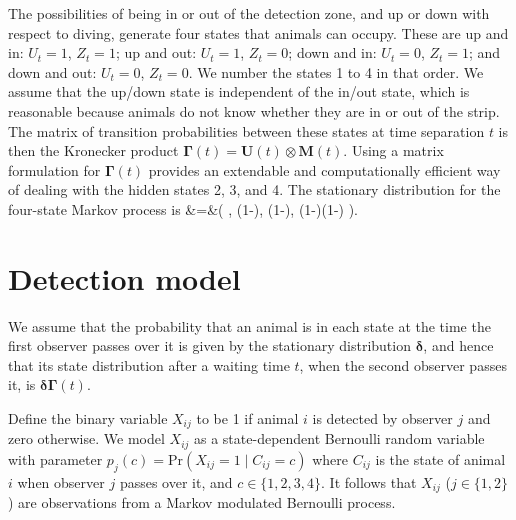 \documentclass[useAMS, usenatbib, referee]{biom}\usepackage[]{graphicx}\usepackage[]{color}
\begin{document}
The possibilities of being in or out of the detection zone, and up or down with respect to diving, generate four states that animals can occupy. These are up and in: $U_t=1$, $Z_t=1$; up and out: $U_t=1$, $Z_t=0$; down and in: $U_t=0$, $Z_t=1$; and down and out: $U_t=0$, $Z_t=0$. We number the states 1 to 4 in that order. We assume that the up/down state is independent of the in/out state, which is reasonable because animals do not know whether they are in or out of the strip. The matrix of transition probabilities between these states at time separation $t$ is then the Kronecker product $\bm{\Gamma}(t)=\bm{U}(t)\otimes\bm{M}(t)$. Using a matrix formulation for $\bm{\Gamma}(t)$ provides an extendable and computationally efficient way of dealing with the hidden states 2, 3, and 4. The stationary distribution for the four-state Markov process is
\be
\bm{\delta}&=&\Bigg(
\gamma{},\;
\gamma\left(1-\right),\;
\left(1-\gamma\right),\;
\left(1-\gamma\right)\left(1-\right)
\Bigg).
\label{eq:delta}
\ee



\section{Detection model}

We assume that the probability that an animal is in each state at the time the first observer passes over it is given by the stationary distribution $\bm{\delta}$, and hence that its state distribution after a waiting time $t$, when the second observer passes it, is $\bm{\delta}\bm{\Gamma}(t)$.

Define the binary variable $X_{ij}$ to be 1 if animal $i$ is detected by observer $j$ and zero otherwise. We model $X_{ij}$ as a state-dependent Bernoulli random variable with parameter $p_j(c)=\mbox{Pr}(X_{ij}=1\mid C_{ij}=c)$ where $C_{ij}$ is the state of animal $i$ when observer $j$ passes over it, and $c\in \{1,2,3,4\}$.
It follows that $X_{ij}$ ($j \in \{1, 2\}$) are observations from a Markov modulated Bernoulli process. %


\end{document}
